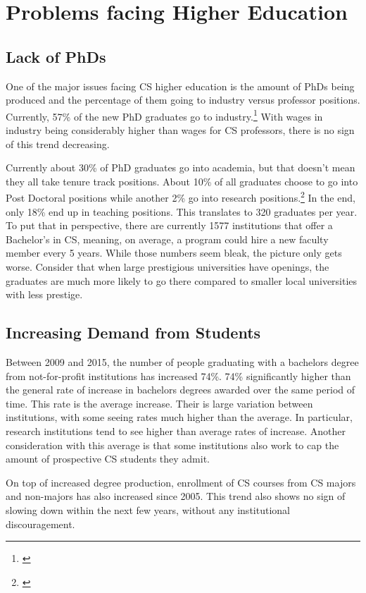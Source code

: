 \documentclass[12pt,twoside]{reedthesis}
\begin{document}
\section{Problems facing Higher Education}

\subsection{Lack of PhDs}
One of the major issues facing CS higher education is the amount of PhDs being produced and the percentage of them going to industry versus professor positions. Currently, 57\% of the new PhD graduates go to industry.\footnote{\cite{zweben_another_2018}} With wages in industry being considerably higher than wages for CS professors, there is no sign of this trend decreasing. 

Currently about 30\% of PhD graduates go into academia, but that doesn't mean they all take tenure track positions. About 10\% of all graduates choose to go into Post Doctoral positions while another 2\% go into research positions.\footnote{\cite{zweben_another_2018}} In the end, only 18\% end up in teaching positions. This translates to 320 graduates per year. To put that in perspective, there are currently 1577 institutions that offer a Bachelor's in CS, meaning, on average, a program could hire a new faculty member every 5 years. While those numbers seem bleak, the picture only gets worse. Consider that when large prestigious universities have openings, the graduates are much more likely to go there compared to smaller local universities with less prestige. 

\subsection{Increasing Demand from Students}
Between 2009 and 2015, the number of people graduating with a bachelors degree from not-for-profit institutions has increased 74\%. 74\% significantly higher than the general rate of increase in bachelors degrees awarded over the same period of time. This rate is the average increase. Their is large variation between institutions, with some seeing rates much higher than the average. In particular, research institutions tend to see higher than average rates of increase. Another consideration with this average is that some institutions also work to cap the amount of prospective CS students they admit. 

On top of increased degree production, enrollment of CS courses from CS majors and non-majors has also increased since 2005. This trend also shows no sign of slowing down within the next few years, without any institutional discouragement. 
\end{document}

